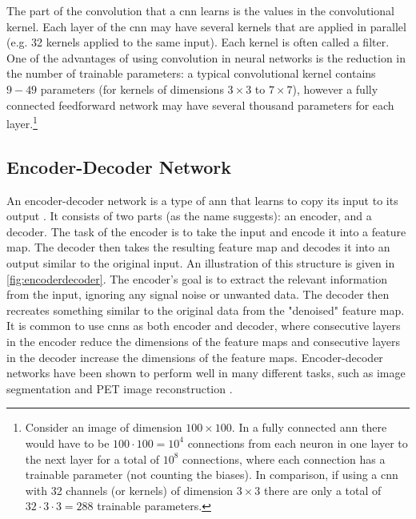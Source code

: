 The part of the convolution that a \gls{cnn} learns is the values in the convolutional kernel. Each layer of the \gls{cnn} may have several kernels that are applied in parallel (e.g. 32 kernels applied to the same input). Each kernel is often called a filter. One of the advantages of using convolution in neural networks is the reduction in the number of trainable parameters: a typical convolutional kernel contains $9-49$ parameters (for kernels of dimensions $3\times3$ to $7\times7$), however a fully connected feedforward network may have several thousand parameters for each layer.\footnote{Consider an image of dimension $100\times100$. In a fully connected \gls{ann} there would have to be $100 \cdot 100 = 10^4$ connections from each neuron in one layer to the next layer for a total of $10^{8}$ connections, where each connection has a trainable parameter (not counting the biases). In comparison, if using a \gls{cnn} with 32 channels (or kernels) of dimension $3\times3$ there are only a total of $32 \cdot 3 \cdot 3 = 288$ trainable parameters. } 

\subsection{Encoder-Decoder Network}
\label{sec:ml:types:encoderdecoder}
An encoder-decoder network is a type of \gls{ann} that learns to copy its input to its output \cite{https://doi.org/10.1002/aic.690370209}. It consists of two parts (as the name suggests): an encoder, and a decoder. The task of the encoder is to take the input and encode it into a feature map. The decoder then takes the resulting feature map and decodes it into an output similar to the original input. An illustration of this structure is given in \cref{fig:encoderdecoder}. The encoder's goal is to extract the relevant information from the input, ignoring any signal noise or unwanted data. The decoder then recreates something similar to the original data from the "denoised" feature map. It is common to use \glspl{cnn} as both encoder and decoder, where consecutive layers in the encoder reduce the dimensions of the feature maps and consecutive layers in the decoder increase the dimensions of the feature maps. Encoder-decoder networks have been shown to perform well in many different tasks, such as image segmentation \cite{7803544} and PET image reconstruction \cite{HAGGSTROM2019253}.  

